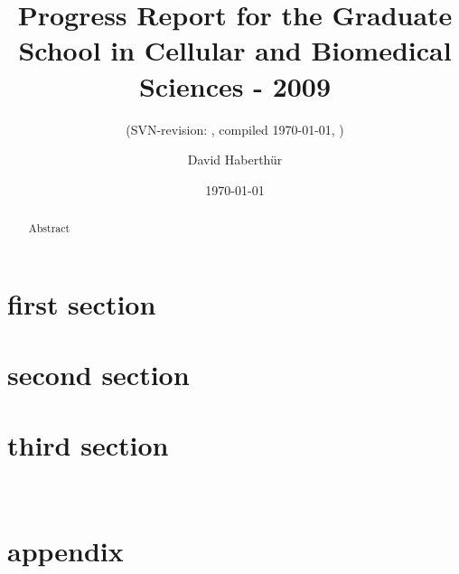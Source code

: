 \documentclass[a4paper,twoside,abstract=true,english,DIV=calc]{scrartcl}
\title{Progress Report for the Graduate School in Cellular and Biomedical Sciences - 2009}
\subtitle{(SVN-revision: \svnkw{LastChangedRevision}, compiled \today, \thistime)}
\author{David Haberthür}
\date{\today}
\begin{document}
\maketitle
{}

\begin{abstract}
Abstract
\end{abstract}

\tableofcontents

\section{first section}
\lipsum[1]

\section{second section}
\lipsum[1]

\section{third section}
\lipsum[1]~\cite{Haberthuer2009}




\appendix
\section{appendix}
\lipsum[1]
\end{document}
